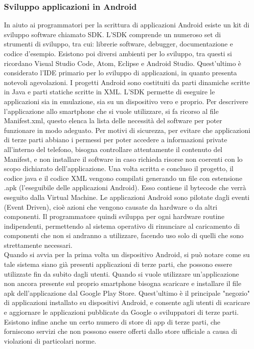 \subsubsection{Sviluppo applicazioni in Android}
In aiuto ai programmatori per la scrittura di applicazioni Android esiste un
kit di sviluppo software  chiamato SDK. L’SDK  comprende un numeroso set di
strumenti di sviluppo, tra cui: librerie software, debugger, documentazione e
codice d’esempio. Esistono poi diversi ambienti per lo sviluppo, tra questi si
ricordano Visual Studio Code, Atom, Eclipse e Android Studio. Quest'ultimo è considerato l'IDE
primario per lo sviluppo di applicazioni, in quanto presenta notevoli agevolazioni.
I progetti Android sono costituiti da parti dinamiche scritte in Java e
parti statiche scritte in XML. L’SDK permette  di eseguire le applicazioni sia
in emulazione, sia su un dispositivo vero e proprio. Per descrivere
l’applicazione allo smartphone che si vuole utilizzare, si fa ricorso al file
Manifest.xml, questo elenca la lista delle necessità del software per poter
funzionare in modo adeguato. Per motivi di sicurezza, per evitare che
applicazioni di terze parti abbiano i permessi per poter accedere a informazioni
private all’interno del
telefono, bisogna controllare attentamente il contenuto del Manifest, e non
installare il software in caso richieda risorse non coerenti con lo scopo
dichiarato dell’applicazione. Una volta scritta e concluso il progetto, il
codice java e il codice XML vengono compilati generando un file con estensione
.apk (l’eseguibile delle applicazioni Android). Esso contiene il bytecode che verrà
eseguito dalla Virtual Machine. Le applicazioni Android sono pilotate
dagli eventi (Event Driven), cioè azioni che vengono causate da hardware o da altri
componenti. Il programmatore quindi sviluppa per ogni hardware routine
indipendenti, permettendo al sistema operativo di rinunciare al caricamento di
componenti che non si andranno a utilizzare, facendo uso solo di quelli che sono
strettamente necessari. \\
Quando si avvia per la prima volta un dispositivo Android, si può notare come su
tale sistema siano già presenti
applicazioni di terze parti, che possono essere utilizzate fin da subito
dagli utenti. Quando si vuole utilizzare un'applicazione non ancora presente sul
proprio smartphone bisogna scaricare e installare il file apk dell’applicazione
dal Google Play Store. Quest’ultimo è il principale "negozio" di
applicazioni installato su dispositivi Android, e consente agli utenti di
scaricare e aggiornare le applicazioni pubblicate da Google o sviluppatori di
terze parti. Esistono infine anche un certo numero di store di app di terze
parti, che forniscono servizi che non possono essere offerti dallo store
ufficiale a causa di violazioni di particolari norme.


